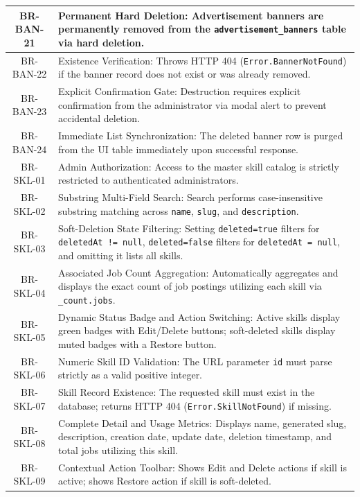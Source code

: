 \begin{longtable}{|c|p{12cm}|}
    BR-BAN-21 & Permanent Hard Deletion: Advertisement banners are permanently removed from the \texttt{advertisement\_banners} table via hard deletion. \\ \hline
    BR-BAN-22 & Existence Verification: Throws HTTP 404 (\texttt{Error.\allowbreak Banner\allowbreak Not\allowbreak Found}) if the banner record does not exist or was already removed. \\ \hline
    BR-BAN-23 & Explicit Confirmation Gate: Destruction requires explicit confirmation from the administrator via modal alert to prevent accidental deletion. \\ \hline
    BR-BAN-24 & Immediate List Synchronization: The deleted banner row is purged from the UI table immediately upon successful response. \\ \hline
    BR-SKL-01 & Admin Authorization: Access to the master skill catalog is strictly restricted to authenticated administrators. \\ \hline
    BR-SKL-02 & Substring Multi-Field Search: Search performs case-insensitive substring matching across \texttt{name}, \texttt{slug}, and \texttt{description}. \\ \hline
    BR-SKL-03 & Soft-Deletion State Filtering: Setting \texttt{deleted=true} filters for \texttt{deletedAt != null}, \texttt{deleted=false} filters for \texttt{deletedAt = null}, and omitting it lists all skills. \\ \hline
    BR-SKL-04 & Associated Job Count Aggregation: Automatically aggregates and displays the exact count of job postings utilizing each skill via \texttt{\_count.jobs}. \\ \hline
    BR-SKL-05 & Dynamic Status Badge and Action Switching: Active skills display green badges with Edit/Delete buttons; soft-deleted skills display muted badges with a Restore button. \\ \hline
    BR-SKL-06 & Numeric Skill ID Validation: The URL parameter \texttt{id} must parse strictly as a valid positive integer. \\ \hline
    BR-SKL-07 & Skill Record Existence: The requested skill must exist in the database; returns HTTP 404 (\texttt{Error.\allowbreak Skill\allowbreak Not\allowbreak Found}) if missing. \\ \hline
    BR-SKL-08 & Complete Detail and Usage Metrics: Displays name, generated slug, description, creation date, update date, deletion timestamp, and total jobs utilizing this skill. \\ \hline
    BR-SKL-09 & Contextual Action Toolbar: Shows Edit and Delete actions if skill is active; shows Restore action if skill is soft-deleted. \\ \hline

\end{longtable}
